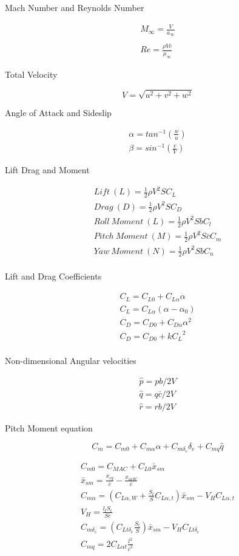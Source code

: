 \documentclass{article}
\def\beq{\begin{equation}}
\def\eeq{\end{equation}}
\def\beqn{\begin{matrix}}
\def\eeqn{\end{matrix}}
\begin{document}
\begin{multicols}{2}

\noindent Mach Number and Reynolds Number

\beq
\beqn
M_{\infty} = \frac{V}{a_{\infty}} \\
\ \\
Re = \frac{\rho V \bar{c}}{\mu_{\infty}}
\eeqn
\eeq

\noindent Total Velocity

\beq
V = \sqrt{u^2 + v^2 + w^2}
\eeq

\noindent Angle of Attack and Sideslip

\beq
\beqn
\alpha = tan^{-1}\left(\frac{w}{u}\right)\\
\beta = sin^{-1}\left(\frac{v}{V}\right)
\eeqn
\eeq

\noindent Lift Drag and Moment

\beq
\beqn
Lift~(L) = \frac{1}{2} \rho V^2 S C_L \\
Drag~(D) = \frac{1}{2} \rho V^2 S C_D\\
Roll~Moment~(L) = \frac{1}{2} \rho V^2 S b C_l\\
Pitch~Moment~(M) = \frac{1}{2} \rho V^2 S \bar{c}C_m\\
Yaw~Moment~(N) = \frac{1}{2} \rho V^2 S b C_n\\
\eeqn
\eeq

\noindent Lift and Drag Coefficients

\beq
\beqn
C_L = C_{L0} + C_{L\alpha}\alpha\\
C_L = C_{L\alpha}(\alpha-\alpha_0)\\
C_D = C_{D0} + C_{D\alpha}\alpha^2 \\
C_D = C_{D0} + k{C_L}^2 \\
\eeqn
\eeq

\noindent Non-dimensional Angular velocities

\beq
\beqn
\hat{p} = pb/2V\\
\hat{q} = q\bar{c}/2V\\
\hat{r} = rb/2V
\eeqn
\eeq

\noindent Pitch Moment equation

\beq
C_m = C_{m0} + C_{m\alpha}\alpha + C_{m\delta_e}\delta_e +
C_{mq}\hat{q}
\eeq

\beq
\beqn
C_{m0} = C_{MAC} + C_{L0}\bar{x}_{sm} \\
\bar{x}_{sm} = \frac{x_{cg}}{\bar{c}} - \frac{x_{acW}}{\bar{c}} \\
C_{m\alpha} = \left(C_{L\alpha,W} +
\frac{S_t}{S}C_{L\alpha,t}\right)\bar{x}_{sm} - V_HC_{L\alpha,t}\\
V_H = \frac{l_tS_t}{S\bar{c}} \\
C_{m\delta_e} = \left(C_{Lt\delta_e}\frac{S_t}{S}\right)\bar{x}_{sm}-V_HC_{Lt\delta_e}\\
C_{mq} = 2C_{L\alpha t}\frac{l^2}{\bar{c}^2}
\eeqn
\eeq


\end{multicols}
\end{document}
